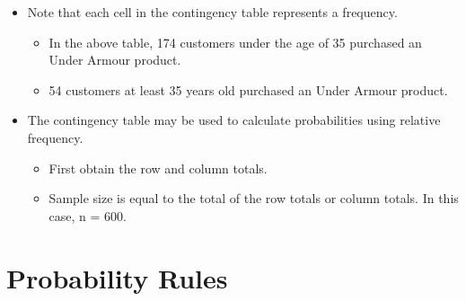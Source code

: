\documentclass[
  letterpaper,
  DIV=11,
  numbers=noendperiod]{scrreprt}
\providecommand{\tightlist}{%
  \setlength{\itemsep}{0pt}\setlength{\parskip}{0pt}}\usepackage{longtable,booktabs,array}
\begin{document}
\begin{itemize}
\tightlist
\item
  Note that each cell in the contingency table represents a frequency.

  \begin{itemize}
  \tightlist
  \item
    In the above table, 174 customers under the age of 35 purchased an
    Under Armour product.
  \item
    54 customers at least 35 years old purchased an Under Armour
    product.
  \end{itemize}
\item
  The contingency table may be used to calculate probabilities using
  relative frequency.

  \begin{itemize}
  \tightlist
  \item
    First obtain the row and column totals.
  \item
    Sample size is equal to the total of the row totals or column
    totals. In this case, n = 600.
  \end{itemize}
\end{itemize}

\section{Probability Rules}\label{probability-rules}
\end{document}

